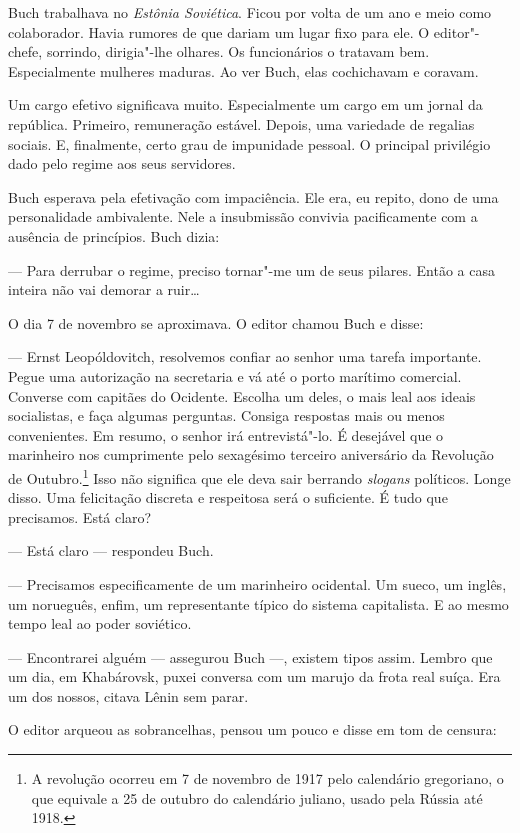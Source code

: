 Buch trabalhava no \emph{Estônia Soviética}. Ficou por volta de um ano e
meio como colaborador. Havia rumores de que dariam um lugar fixo para
ele. O editor"-chefe, sorrindo, dirigia"-lhe olhares. Os funcionários o
tratavam bem. Especialmente mulheres maduras. Ao ver Buch, elas
cochichavam e coravam.

Um cargo efetivo significava muito. Especialmente um cargo em um jornal
da república. Primeiro, remuneração estável. Depois, uma variedade de
regalias sociais. E, finalmente, certo grau de impunidade pessoal. O
principal privilégio dado pelo regime aos seus servidores.

Buch esperava pela efetivação com impaciência. Ele era, eu repito, dono
de uma personalidade ambivalente. Nele a insubmissão convivia
pacificamente com a ausência de princípios. Buch dizia:

--- Para derrubar o regime, preciso tornar"-me um de seus pilares. Então
a casa inteira não vai demorar a ruir\ldots{}

O dia 7 de novembro se aproximava. O editor chamou Buch e disse:

--- Ernst Leopóldovitch, resolvemos confiar ao senhor uma tarefa
importante. Pegue uma autorização na secretaria e vá até o porto marítimo
comercial. Converse com capitães do Ocidente. Escolha um deles, o mais
leal aos ideais socialistas, e faça algumas perguntas. Consiga respostas
mais ou menos convenientes. Em resumo, o senhor irá entrevistá"-lo. É
desejável que o marinheiro nos cumprimente pelo sexagésimo terceiro
aniversário da Revolução de Outubro.\footnote{A revolução ocorreu em 7 de novembro de 1917 pelo calendário gregoriano, o que equivale a 25 de outubro do calendário juliano, usado pela Rússia até 1918.} Isso não significa que ele deva
sair berrando \emph{slogans} políticos. Longe disso. Uma felicitação
discreta e respeitosa será o suficiente. É tudo que precisamos. Está
claro?

--- Está claro --- respondeu Buch.

--- Precisamos especificamente de um marinheiro ocidental. Um sueco, um
inglês, um norueguês, enfim, um representante típico do sistema
capitalista. E ao mesmo tempo leal ao poder soviético.

--- Encontrarei alguém --- assegurou Buch ---, existem tipos assim.
Lembro que um dia, em Khabárovsk, puxei conversa com um marujo da frota
real suíça. Era um dos nossos, citava Lênin sem parar.

O editor arqueou as sobrancelhas, pensou um pouco e disse em tom de
censura:

